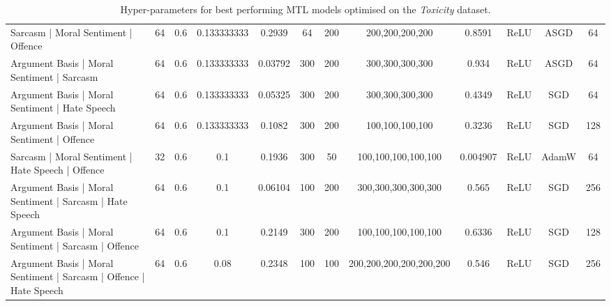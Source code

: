 \begin{landscape}
\begin{table}[]
{\begin{tabular}{l|ccccccccccc}
      Sarcasm | Moral Sentiment | Offence                                & 64         & 0.6              & 0.133333333      & 0.2939  & 64            & 200    & 200,200,200,200         & 0.8591        & ReLU          & ASGD      & 64         \\
      Argument Basis | Moral Sentiment | Sarcasm                         & 64         & 0.6              & 0.133333333      & 0.03792 & 300           & 200    & 300,300,300,300         & 0.934         & ReLU          & ASGD      & 64         \\
      Argument Basis | Moral Sentiment | Hate Speech                     & 64         & 0.6              & 0.133333333      & 0.05325 & 300           & 200    & 300,300,300,300         & 0.4349        & ReLU          & SGD       & 64         \\
      Argument Basis | Moral Sentiment | Offence                         & 64         & 0.6              & 0.133333333      & 0.1082  & 300           & 200    & 100,100,100,100         & 0.3236        & ReLU          & SGD       & 128        \\
      Sarcasm | Moral Sentiment | Hate Speech | Offence                  & 32         & 0.6              & 0.1              & 0.1936  & 300           & 50     & 100,100,100,100,100     & 0.004907      & ReLU          & AdamW     & 64         \\
      Argument Basis | Moral Sentiment | Sarcasm | Hate Speech           & 64         & 0.6              & 0.1              & 0.06104 & 100           & 200    & 300,300,300,300,300     & 0.565         & ReLU          & SGD       & 256        \\
      Argument Basis | Moral Sentiment | Sarcasm | Offence               & 64         & 0.6              & 0.1              & 0.2149  & 300           & 200    & 100,100,100,100,100     & 0.6336        & ReLU          & SGD       & 128        \\
      Argument Basis | Moral Sentiment | Sarcasm | Offence | Hate Speech & 64         & 0.6              & 0.08             & 0.2348  & 100           & 100    & 200,200,200,200,200,200 & 0.546         & ReLU          & SGD       & 256
    \end{tabular}%
    }
    \caption{Hyper-parameters for best performing MTL models optimised on the \textit{Toxicity} dataset.}
    \label{tab:mtl_params_wulczyn}
  \end{table}
\end{landscape}



